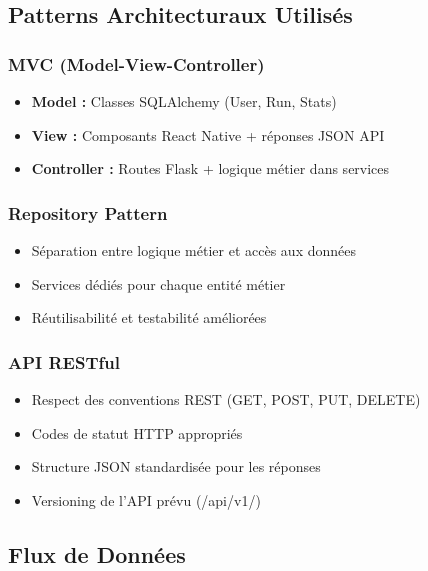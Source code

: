 \subsection{Patterns Architecturaux Utilisés}

\subsubsection{MVC (Model-View-Controller)}

\begin{itemize}
    \item \textbf{Model :} Classes SQLAlchemy (User, Run, Stats)
    \item \textbf{View :} Composants React Native + réponses JSON API
    \item \textbf{Controller :} Routes Flask + logique métier dans services
\end{itemize}

\subsubsection{Repository Pattern}

\begin{itemize}
    \item Séparation entre logique métier et accès aux données
    \item Services dédiés pour chaque entité métier
    \item Réutilisabilité et testabilité améliorées
\end{itemize}

\subsubsection{API RESTful}

\begin{itemize}
    \item Respect des conventions REST (GET, POST, PUT, DELETE)
    \item Codes de statut HTTP appropriés
    \item Structure JSON standardisée pour les réponses
    \item Versioning de l'API prévu (/api/v1/)
\end{itemize}

\subsection{Flux de Données}

